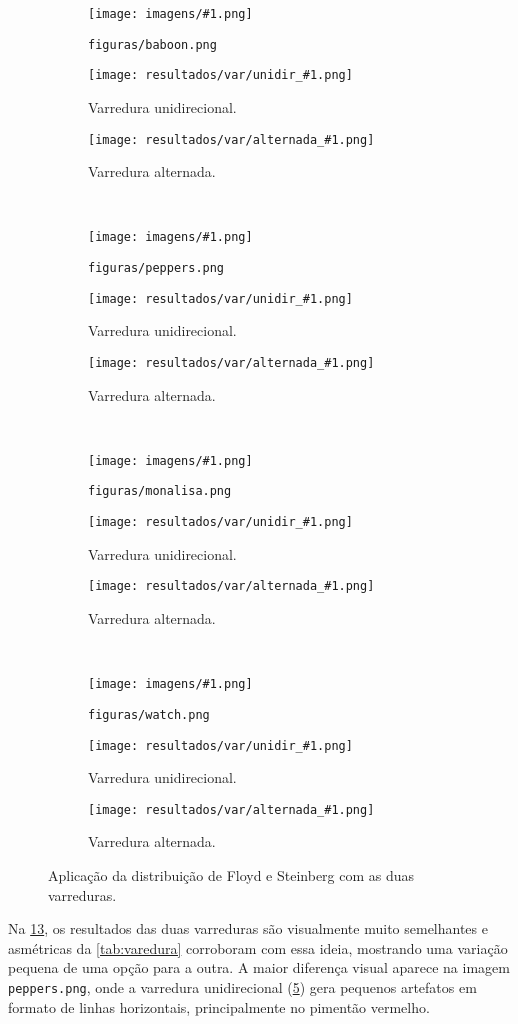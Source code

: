 \newcommand{\imagem}[1]{
    \centering
    \begin{subfigure}{0.32\textwidth}
        \centering
        \texttt{[image: imagens/\#1.png]}
        \caption{\texttt{figuras/#1.png}}
        \label{fig:#1:orig}
    \end{subfigure}%
    \begin{subfigure}{0.32\textwidth}
        \centering
        \texttt{[image: resultados/var/unidir\_\#1.png]}
        \caption{Varredura unidirecional.}
        \label{fig:#1:unidir}
    \end{subfigure}%
    \begin{subfigure}{0.32\textwidth}
        \centering
        \texttt{[image: resultados/var/alternada\_\#1.png]}
        \caption{Varredura alternada.}
        \label{fig:#1:alt}
    \end{subfigure}
}

\begin{figure}[H]
    \centering
    \imagem{baboon}\\[8pt]
    \imagem{peppers}\\[8pt]
    \imagem{monalisa}\\[8pt]
    \imagem{watch}

    \caption{Aplicação da distribuição de Floyd e Steinberg com as duas varreduras.}
    \label{fig:resultado:varredura}
\end{figure}

Na \cref{fig:resultado:varredura}, os resultados das duas varreduras são visualmente muito semelhantes e asmétricas da \cref{tab:varedura} corroboram com essa ideia, mostrando uma variação pequena de uma opção para a outra. A maior diferença visual aparece na imagem \texttt{peppers.png}, onde a varredura unidirecional (\ref{fig:peppers:unidir}) gera pequenos artefatos em formato de linhas horizontais, principalmente no pimentão vermelho.

